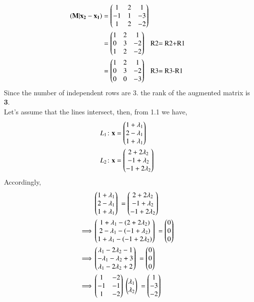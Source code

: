 \documentclass[journal,12pt,twocolumn]{IEEEtran}
\renewcommand\thesection{\arabic{section}}
\begin{document}
\begin{enumerate}[label=\thesection.\arabic*.,ref=\thesection.\theenumi]
\begin{align*}
\mathbf{(M|x_2-x_1)}&=\begin{pmatrix}1 & 2 & 1\\ -1 & 1 & -3\\ 1 & 2 &-2\end{pmatrix} \\
&=\begin{pmatrix}1 & 2 & 1\\ 0 & 3 & -2\\ 1& 2 &-2\end{pmatrix}~~~\text{R2= R2+R1}\\
&=\begin{pmatrix}1 & 2 & 1\\ 0 & 3 & -2\\ 0& 0 &-3\end{pmatrix}~~~\text{R3= R3-R1}\\
\end{align*}
Since the number of independent rows are 3. the rank of the augmented matrix is \textbf{3}.\\
Let's assume that the lines intersect, then, from 1.1 we have,
\begin{align*}
    L_1\colon& \mathbf{x}=\begin{pmatrix}1+\lambda_1\\2-\lambda_1\\1+\lambda_1\end{pmatrix}\ \\
    L_2\colon& \mathbf{x}=\begin{pmatrix}2+2\lambda_2\\-1+\lambda_2\\-1+2\lambda_2\end{pmatrix}\ \\
\end{align*}
Accordingly,
\begin{align*}
& \myvec{1+\lambda_1\\2-\lambda_1\\1+\lambda_1}\ =\myvec{2+2\lambda_2\\-1+\lambda_2\\-1+2\lambda_2}\ \\
\implies & \myvec{1+\lambda_1-(2+2\lambda_2)\\2-\lambda_1-(-1+\lambda_2)\\1+\lambda_1-(-1+2\lambda_2)}\ = \myvec{0\\0\\0}\ \\
\implies & \myvec{\lambda_1-2\lambda_2-1\\-\lambda_1-\lambda_2+3\\\lambda_1-2\lambda_2+2}\ = \myvec{0\\0\\0}\ \\
\implies & \myvec{1 & -2\\ -1 & -1\\ 1 & -2}\ \myvec{\lambda_1\\ \lambda_2}\ = \myvec{1\\-3\\-2}\ \\

\end{align*}
\end{enumerate}
\end{document}
